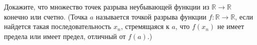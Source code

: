 Докажите, что множество точек разрыва неубывающей функции из $\mathbb{R} \to \mathbb{R}$ конечно или счетно. (Точка $a$
называется точкой разрыва функции $f:\mathbb{R} \to \mathbb{R}$, если найдется такая последовательность $x_n$, стремящаяся к
$a$, что $f(x_n)$ не имеет предела или имеет предел, отличный от $f(a)$.)